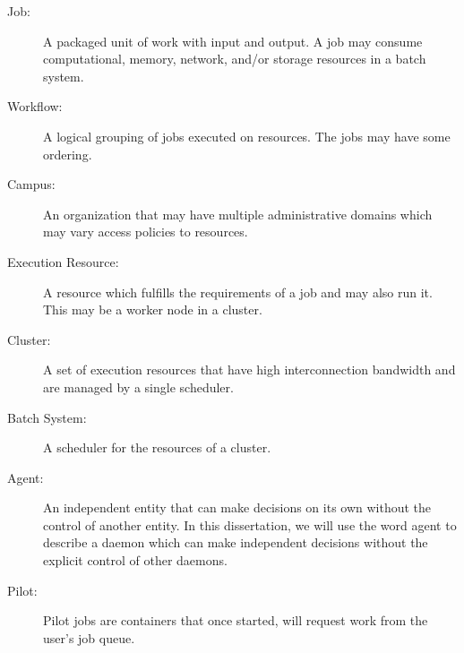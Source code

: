 \begin{description}
	\item[Job:] A packaged unit of work with input and output.  A job may consume computational, memory, network, and/or storage resources in a batch system.
	\item[Workflow:] A logical grouping of jobs executed on resources.  The jobs may have some ordering.
	\item[Campus:] An organization that may have multiple administrative domains which may vary access policies to resources.
	\item[Execution Resource:] A resource which fulfills the requirements of a job and may also run it.  This may be a worker node in a cluster.
	\item[Cluster:] A set of execution resources that have high interconnection bandwidth and are managed by a single scheduler.
	\item[Batch System:] A scheduler for the resources of a cluster.
	\item[Agent:] An independent entity that can make decisions on its own without the control of another entity.  In this dissertation, we will use the word agent to describe a daemon which can make independent decisions without the explicit control of other daemons.
	\item[Pilot:] Pilot jobs are containers that once started, will request work from the user's job queue.
\end{description}



